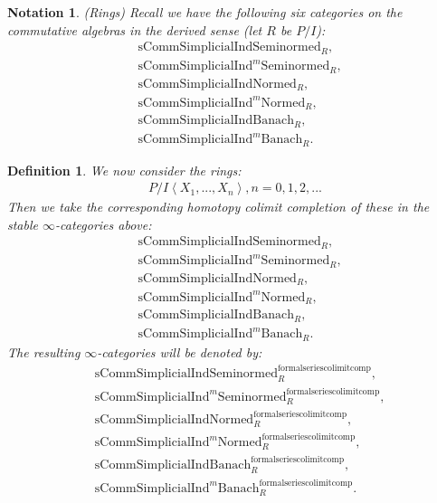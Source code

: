 \documentclass[12pt]{book}
\newtheorem{notation}{Notation}
\newtheorem{definition}{Definition}
\begin{document}
\begin{notation}\mbox{\rm{(Rings)}}
Recall we have the following six categories on the commutative algebras in the derived sense (let $R$ be $P/I$):
\begin{align}
&\mathrm{sComm}\mathrm{Simplicial}\mathrm{Ind}\mathrm{Seminormed}_R,\\
&\mathrm{sComm}\mathrm{Simplicial}\mathrm{Ind}^m\mathrm{Seminormed}_R,\\
&\mathrm{sComm}\mathrm{Simplicial}\mathrm{Ind}\mathrm{Normed}_R,\\
&\mathrm{sComm}\mathrm{Simplicial}\mathrm{Ind}^m\mathrm{Normed}_R,\\
&\mathrm{sComm}\mathrm{Simplicial}\mathrm{Ind}\mathrm{Banach}_R,\\
&\mathrm{sComm}\mathrm{Simplicial}\mathrm{Ind}^m\mathrm{Banach}_R.	
\end{align}
	
\end{notation}



\begin{definition}
We now consider the rings:
\begin{align}
P/I\left<X_1,...,X_n\right>,n=0,1,2,...	
\end{align}
Then we take the corresponding homotopy colimit completion of these in the stable $\infty$-categories above:
\begin{align}
&\mathrm{sComm}\mathrm{Simplicial}\mathrm{Ind}\mathrm{Seminormed}_R,\\
&\mathrm{sComm}\mathrm{Simplicial}\mathrm{Ind}^m\mathrm{Seminormed}_R,\\
&\mathrm{sComm}\mathrm{Simplicial}\mathrm{Ind}\mathrm{Normed}_R,\\
&\mathrm{sComm}\mathrm{Simplicial}\mathrm{Ind}^m\mathrm{Normed}_R,\\
&\mathrm{sComm}\mathrm{Simplicial}\mathrm{Ind}\mathrm{Banach}_R,\\
&\mathrm{sComm}\mathrm{Simplicial}\mathrm{Ind}^m\mathrm{Banach}_R.	
\end{align}
The resulting $\infty$-categories will be denoted by:
\begin{align}
&\mathrm{sComm}\mathrm{Simplicial}\mathrm{Ind}\mathrm{Seminormed}^\mathrm{formalseriescolimitcomp}_R,\\
&\mathrm{sComm}\mathrm{Simplicial}\mathrm{Ind}^m\mathrm{Seminormed}^\mathrm{formalseriescolimitcomp}_R,\\
&\mathrm{sComm}\mathrm{Simplicial}\mathrm{Ind}\mathrm{Normed}^\mathrm{formalseriescolimitcomp}_R,\\
&\mathrm{sComm}\mathrm{Simplicial}\mathrm{Ind}^m\mathrm{Normed}^\mathrm{formalseriescolimitcomp}_R,\\
&\mathrm{sComm}\mathrm{Simplicial}\mathrm{Ind}\mathrm{Banach}^\mathrm{formalseriescolimitcomp}_R,\\
&\mathrm{sComm}\mathrm{Simplicial}\mathrm{Ind}^m\mathrm{Banach}^\mathrm{formalseriescolimitcomp}_R.	
\end{align}	
\end{definition}
\end{document}
